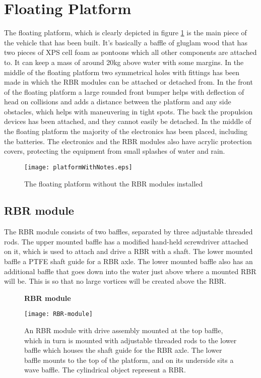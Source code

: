 \section{Floating Platform}
The floating platform, which is clearly depicted in figure \ref{fig:floatingPlatform} is the main piece of the vehicle that has been built. It's basically a baffle of gluglam wood that has two pieces of XPS cell foam as pontoons which all other components are attached to. It can keep a mass of around 20kg above water with some margins. In the middle of the floating platform two symmetrical holes with fittings has been made in which the RBR modules can be attached or detached from. In the front of the floating platform a large rounded front bumper helps with deflection of head on collisions and adds a distance between the platform and any side obstacles, which helps with maneuvering in tight spots. The back the propulsion devices has been attached, and they cannot easily be detached. In the middle of the floating platform the majority of the electronics has been placed, including the batteries. The electronics and the RBR modules also have acrylic protection covers, protecting the equipment from small splashes of water and rain.
\begin{figure}[h]
   \centering
   \texttt{[image: platformWithNotes.eps]}
   \caption{The floating platform without the RBR modules installed}
   \label{fig:floatingPlatform}
\end{figure}           

\subsection{RBR module}
The RBR module consists of two baffles, separated by three adjustable threaded
rods. The upper mounted baffle has a modified hand-held screwdriver attached on
it, which is used to attach and drive a RBR with a shaft. The lower mounted
baffle a PTFE shaft guide for a RBR axle. The lower mounted baffle also has an
additional baffle that goes down into the water just above where a mounted RBR
will be. This is so that no large vortices will be created above the RBR.

\begin{figure}[H]
  \centering
  \textbf{RBR module}
  \par\medskip
  \texttt{[image: RBR-module]}
  \caption{An RBR module with drive assembly mounted at the top baffle,
    which in turn is mounted with adjustable threaded rods to the lower baffle
    which houses the shaft guide for the RBR axle. The lower baffle mounts to the
    top of the platform, and on its underside sits a wave baffle. The cylindrical object
  represent a RBR.}\label{fig:rbr-module}
\end{figure}

